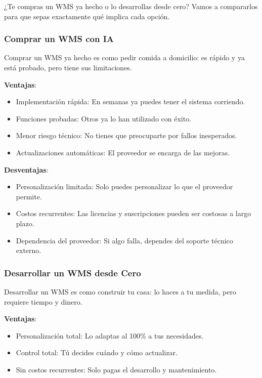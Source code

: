 ¿Te compras un WMS ya hecho o lo desarrollas desde cero? Vamos a compararlos para que sepas exactamente qué implica cada opción.

\subsubsection{Comprar un WMS con IA}

Comprar un WMS ya hecho es como pedir comida a domicilio: es rápido y ya está probado, pero tiene sus limitaciones.

\textbf{Ventajas}:
\begin{itemize}
    \item Implementación rápida: En semanas ya puedes tener el sistema corriendo.
    \item Funciones probadas: Otros ya lo han utilizado con éxito.
    \item Menor riesgo técnico: No tienes que preocuparte por fallos inesperados.
    \item Actualizaciones automáticas: El proveedor se encarga de las mejoras.
\end{itemize}

\textbf{Desventajas}:
\begin{itemize}
    \item Personalización limitada: Solo puedes personalizar lo que el proveedor permite.
    \item Costos recurrentes: Las licencias y suscripciones pueden ser costosas a largo plazo.
    \item Dependencia del proveedor: Si algo falla, dependes del soporte técnico externo.
\end{itemize}

\subsubsection{Desarrollar un WMS desde Cero}

Desarrollar un WMS es como construir tu casa: lo haces a tu medida, pero requiere tiempo y dinero.

\textbf{Ventajas}:
\begin{itemize}
    \item Personalización total: Lo adaptas al 100\% a tus necesidades.
    \item Control total: Tú decides cuándo y cómo actualizar.
    \item Sin costos recurrentes: Solo pagas el desarrollo y mantenimiento.
\end{itemize}


